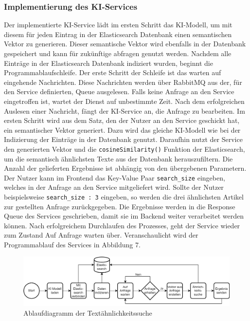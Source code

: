 \subsubsection{Implementierung des KI-Services}
Der implementierte KI-Service lädt im ersten Schritt das KI-Modell, um mit diesem für jeden Eintrag in der Elasticsearch Datenbank einen semantischen Vektor zu generieren. Dieser semantische Vektor wird ebenfalls in der Datenbank gespeichert und kann für zukünftige abfragen genutzt werden.
Nachdem alle Einträge in der Elasticsearch Datenbank indiziert wurden, beginnt die Programmablaufschleife. Der erste Schritt der Schleife ist das warten auf eingehende Nachrichten. Diese Nachrichten werden über RabbitMQ aus der, für den Service definierten, Queue ausgelesen. Falls keine Anfrage an den Service eingetroffen ist, wartet der Dienst auf unbestimmte Zeit. Nach dem erfolgreichen Auslesen einer Nachricht, fängt der KI-Service an, die Anfrage zu bearbeiten. Im ersten Schritt wird aus dem Satz, den der Nutzer an den Service geschickt hat, ein semantischer Vektor generiert. Dazu wird das gleiche KI-Modell wie bei der Indizierung der Einträge in der Datenbank genutzt. Daraufhin nutzt der Service den generierten Vektor und die \texttt{cosineSimilarity()} Funktion der Elasticsearch, um die semantisch ähnlichsten Texte aus der Datenbank herauszufiltern. Die Anzahl der gelieferten Ergebnisse ist abhängig von den übergebenen Parametern. Der Nutzer kann im Frontend das Key-Value Paar \texttt{search\_{}size} eingeben, welches in der Anfrage an den Service mitgeliefert wird. Sollte der Nutzer beispielsweise \texttt{\glqq search\_{}size : 3\grqq{}} eingeben, so werden die drei ähnlichsten Artikel zur gestellten Anfrage zurückgegeben. Die Ergebnisse werden in die Response Queue des Services geschrieben, damit sie im Backend weiter verarbeitet werden können. Nach erfolgreichem Durchlaufen des Prozesses, geht der Service wieder zum Zustand \glqq Auf Anfrage warten\grqq{} über. Veranschaulicht wird der Programmablauf des Services in Abbildung 7.

\begin{figure}[H]
  \centering
    \includegraphics[width = 15cm]{bilder/KIAblauf}
    \caption{Ablaufdiagramm der Textähnlichkeitssuche}
\end{figure}

